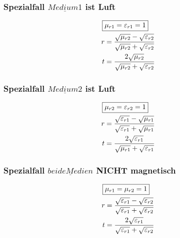 \subsubsection[Spezialfall Medium 1 ist Luft]{Spezialfall $\underline{Medium 1}$ ist Luft}
\begin{align*}
    \Aboxed{ & \mu_{r1} = \varepsilon_{r1} = 1}                                                            \\
    r        & = \frac{\sqrt{\mu_{r2}}-\sqrt{\varepsilon_{r2}}}{{\sqrt{\mu_{r2}}+\sqrt{\varepsilon_{r2}}}} \\
    t        & = \frac{2\sqrt{\mu_{r2}}}{\sqrt{\mu_{r2}}+\sqrt{\varepsilon_{r2}}}
\end{align*}

\subsubsection[Spezialfall Medium 2 ist Luft]{Spezialfall $\underline{Medium 2}$ ist Luft}
\begin{align*}
    \Aboxed{ & \mu_{r2} = \varepsilon_{r2} = 1}                                                            \\
    r        & = \frac{\sqrt{\varepsilon_{r1}}-\sqrt{\mu_{r1}}}{{\sqrt{\varepsilon_{r1}}+\sqrt{\mu_{r1}}}} \\
    t        & = \frac{2\sqrt{\varepsilon_{r1}}}{\sqrt{\mu_{r1}}+\sqrt{\varepsilon_{r1}}}
\end{align*}

\subsubsection[Spezialfall beide Medien NICHT magnetisch]{Spezialfall $\underline{beide Medien}$ NICHT magnetisch}
\begin{align*}
    \Aboxed{ & \mu_{r1} = \mu_{r2} = 1}                                                                                    \\
    r        & = \frac{\sqrt{\varepsilon_{r1}}-\sqrt{\varepsilon_{r2}}}{{\sqrt{\varepsilon_{r1}}+\sqrt{\varepsilon_{r2}}}} \\
    t        & = \frac{2\sqrt{\varepsilon_{r1}}}{\sqrt{\varepsilon_{r1}}+\sqrt{\varepsilon_{r2}}}
\end{align*}

